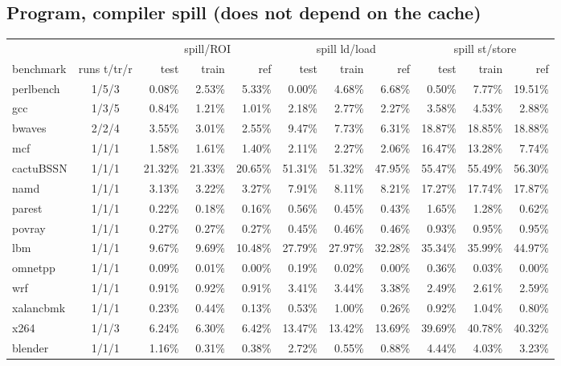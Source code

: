 \documentclass[10pt,a4paper,landscape]{article}
\begin{document}
\subsection*{Program, compiler spill (does not depend on the cache)}
{\footnotesize
\begin{longtable}{lcrrrrrrrrr}
\toprule
& & \multicolumn{3}{c}{spill/ROI} & \multicolumn{3}{c}{spill ld/load} & \multicolumn{3}{c}{spill st/store} \\
\cmidrule(lr){3-5}\cmidrule(lr){6-8}\cmidrule(lr){9-11}
benchmark & runs t/tr/r & test & train & ref & test & train & ref & test & train & ref \\
\midrule
\endhead
\bottomrule
\endfoot
perlbench & 1/5/3 & 0.08\% & 2.53\% & 5.33\% & 0.00\% & 4.68\% & 6.68\% & 0.50\% & 7.77\% & 19.51\% \\
gcc & 1/3/5 & 0.84\% & 1.21\% & 1.01\% & 2.18\% & 2.77\% & 2.27\% & 3.58\% & 4.53\% & 2.88\% \\
bwaves & 2/2/4 & 3.55\% & 3.01\% & 2.55\% & 9.47\% & 7.73\% & 6.31\% & 18.87\% & 18.85\% & 18.88\% \\
mcf & 1/1/1 & 1.58\% & 1.61\% & 1.40\% & 2.11\% & 2.27\% & 2.06\% & 16.47\% & 13.28\% & 7.74\% \\
cactuBSSN & 1/1/1 & 21.32\% & 21.33\% & 20.65\% & 51.31\% & 51.32\% & 47.95\% & 55.47\% & 55.49\% & 56.30\% \\
namd & 1/1/1 & 3.13\% & 3.22\% & 3.27\% & 7.91\% & 8.11\% & 8.21\% & 17.27\% & 17.74\% & 17.87\% \\
parest & 1/1/1 & 0.22\% & 0.18\% & 0.16\% & 0.56\% & 0.45\% & 0.43\% & 1.65\% & 1.28\% & 0.62\% \\
povray & 1/1/1 & 0.27\% & 0.27\% & 0.27\% & 0.45\% & 0.46\% & 0.46\% & 0.93\% & 0.95\% & 0.95\% \\
lbm & 1/1/1 & 9.67\% & 9.69\% & 10.48\% & 27.79\% & 27.97\% & 32.28\% & 35.34\% & 35.99\% & 44.97\% \\
omnetpp & 1/1/1 & 0.09\% & 0.01\% & 0.00\% & 0.19\% & 0.02\% & 0.00\% & 0.36\% & 0.03\% & 0.00\% \\
wrf & 1/1/1 & 0.91\% & 0.92\% & 0.91\% & 3.41\% & 3.44\% & 3.38\% & 2.49\% & 2.61\% & 2.59\% \\
xalancbmk & 1/1/1 & 0.23\% & 0.44\% & 0.13\% & 0.53\% & 1.00\% & 0.26\% & 0.92\% & 1.04\% & 0.80\% \\
x264 & 1/1/3 & 6.24\% & 6.30\% & 6.42\% & 13.47\% & 13.42\% & 13.69\% & 39.69\% & 40.78\% & 40.32\% \\
blender & 1/1/1 & 1.16\% & 0.31\% & 0.38\% & 2.72\% & 0.55\% & 0.88\% & 4.44\% & 4.03\% & 3.23\% \\

\end{longtable}}
\end{document}
